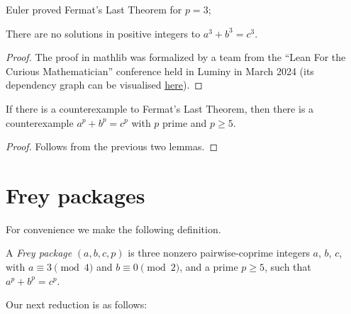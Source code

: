Euler proved Fermat's Last Theorem for $p=3$;

\begin{lemma}\label{fermatLastTheoremThree}\leanok
{}
  There are no solutions in positive integers to $a^3+b^3=c^3$.
\end{lemma}
\begin{proof}
  \leanok
  The proof in mathlib was formalized by a team from the ``Lean For the Curious Mathematician'' conference held in Luminy in March 2024
  (its dependency graph can be visualised \href{https://pitmonticone.github.io/FLT3/blueprint/dep_graph_document.html}{\underline{here}}).
\end{proof}

\begin{corollary}\label{FermatLastTheorem.of_p_ge_5}\leanok If there is a counterexample to
  Fermat's Last Theorem, then there is a counterexample $a^p+b^p=c^p$ with $p$ prime and $p\geq 5$.
\end{corollary}
\begin{proof}\leanok Follows from the
  previous two lemmas.\end{proof}

\section{Frey packages}

For convenience we make the following definition.

\begin{definition}\label{FreyPackage}\leanok A \emph{Frey package} $(a,b,c,p)$
is three nonzero pairwise-coprime integers $a$, $b$, $c$, with $a\equiv3\pmod4$ and $b\equiv0\pmod2$,
and a prime $p\geq5$, such that $a^p+b^p=c^p$.\end{definition}

Our next reduction is as follows:

